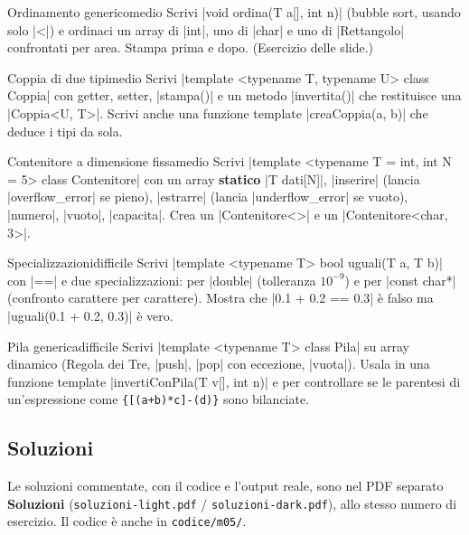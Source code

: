 \begin{esercizio}{Ordinamento generico}{medio}
Scrivi \cc|void ordina(T a[], int n)| (bubble sort, usando solo \cc|<|) e ordinaci
un array di \cc|int|, uno di \cc|char| e uno di \cc|Rettangolo| confrontati per area.
Stampa prima e dopo. (Esercizio delle slide.)
\end{esercizio}

\begin{esercizio}{Coppia di due tipi}{medio}
Scrivi \cc|template <typename T, typename U> class Coppia| con getter, setter,
\cc|stampa()| e un metodo \cc|invertita()| che restituisce una \cc|Coppia<U, T>|.
Scrivi anche una funzione template \cc|creaCoppia(a, b)| che deduce i tipi da sola.
\end{esercizio}

\begin{esercizio}{Contenitore a dimensione fissa}{medio}
Scrivi \cc|template <typename T = int, int N = 5> class Contenitore| con un array
\textbf{statico} \cc|T dati[N]|, \cc|inserire| (lancia \cc|overflow_error| se pieno),
\cc|estrarre| (lancia \cc|underflow_error| se vuoto), \cc|numero|, \cc|vuoto|,
\cc|capacita|. Crea un \cc|Contenitore<>| e un \cc|Contenitore<char, 3>|.
\end{esercizio}

\begin{esercizio}{Specializzazioni}{difficile}
Scrivi \cc|template <typename T> bool uguali(T a, T b)| con \cc|==| e due
specializzazioni: per \cc|double| (tolleranza $10^{-9}$) e per \cc|const char*|
(confronto carattere per carattere). Mostra che \cc|0.1 + 0.2 == 0.3| è falso ma
\cc|uguali(0.1 + 0.2, 0.3)| è vero.
\end{esercizio}

\begin{esercizio}{Pila generica}{difficile}
Scrivi \cc|template <typename T> class Pila| su array dinamico (Regola dei Tre,
\cc|push|, \cc|pop| con eccezione, \cc|vuota|). Usala in una funzione template
\cc|invertiConPila(T v[], int n)| e per controllare se le parentesi di
un'espressione come \texttt{\{[(a+b)*c]-(d)\}} sono bilanciate.
\end{esercizio}

\subsection*{Soluzioni}
Le soluzioni commentate, con il codice e l'output reale, sono nel PDF separato
\textbf{Soluzioni} (\texttt{soluzioni-light.pdf} / \texttt{soluzioni-dark.pdf}),
allo stesso numero di esercizio. Il codice è anche in \texttt{codice/m05/}.
